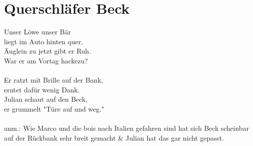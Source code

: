 \documentclass[11pt]{article}
\begin{document}
\filbreak
\section*{Querschläfer Beck}

Unser Löwe unser Bär\\
liegt im Auto hinten quer.\\
Äuglein zu jetzt gibt er Ruh.\\
War er am Vortag hackezu?\\
\\
Er ratzt mit Brille auf der Bank,\\
erntet dafür wenig Dank.\\
Julian schaut auf den Beck,\\
er grummelt "Türe auf und weg."\\
\\
anm.: Wie Marco und die bois nach Italien gefahren sind hat sich Beck scheinbar auf der Rückbank sehr breit gemacht \& Julian hat das gar nicht gepasst.
\end{document}
